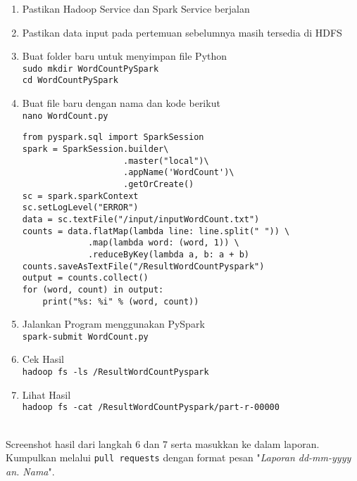 \documentclass[a4paper]{tufte-handout}
\begin{document}
\begin{enumerate}
\item Pastikan Hadoop Service dan Spark Service berjalan
\item Pastikan data input pada pertemuan sebelumnya masih tersedia di HDFS
\item Buat folder baru untuk menyimpan file Python \\
{\tt sudo mkdir WordCountPySpark} \\
{\tt cd WordCountPySpark}

\item Buat file baru dengan nama dan kode berikut \\
{\tt nano WordCount.py}
\begin{lstlisting}
from pyspark.sql import SparkSession
spark = SparkSession.builder\
                    .master("local")\
                    .appName('WordCount')\
                    .getOrCreate()
sc = spark.sparkContext
sc.setLogLevel("ERROR")
data = sc.textFile("/input/inputWordCount.txt")
counts = data.flatMap(lambda line: line.split(" ")) \
             .map(lambda word: (word, 1)) \
             .reduceByKey(lambda a, b: a + b)
counts.saveAsTextFile("/ResultWordCountPyspark")
output = counts.collect()
for (word, count) in output:
    print("%s: %i" % (word, count))
\end{lstlisting}

\item Jalankan Program menggunakan PySpark \\
{\tt spark-submit WordCount.py}

\item Cek Hasil \\
{\tt hadoop fs -ls /ResultWordCountPyspark}

\item Lihat Hasil \\
{\tt hadoop fs -cat /ResultWordCountPyspark/part-r-00000}
\end{enumerate}

\vspace*{-.5cm}
 \\
Screenshot hasil dari langkah 6 dan 7 serta masukkan ke dalam laporan. Kumpulkan melalui {\tt pull requests} dengan format pesan "\textit{Laporan dd-mm-yyyy an. Nama}".

\hrulefill

\clearpage
{}
\end{document}
